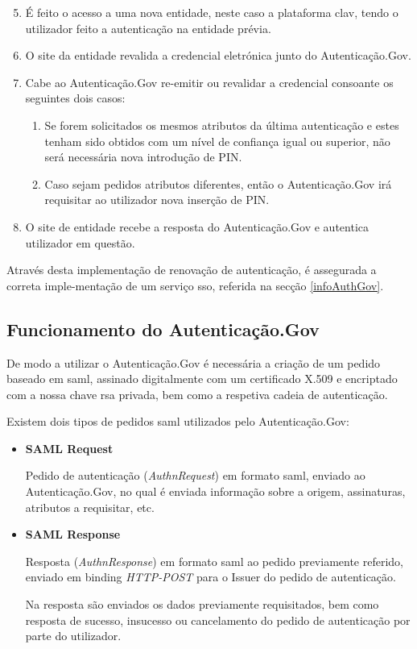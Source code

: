 \begin{enumerate}
    \setcounter{enumi}{4}
    \item É feito o acesso a uma nova entidade, neste caso a plataforma \gls{clav}, tendo o utilizador feito a autenticação na entidade prévia.
    \item O site da entidade revalida a credencial eletrónica junto do Autenticação.Gov.
    \item Cabe ao Autenticação.Gov re-emitir ou revalidar a credencial consoante os seguintes dois casos:
    \begin{enumerate}
        \item Se forem solicitados os mesmos atributos da última autenticação e estes tenham sido obtidos com um nível de confiança igual ou superior, não será necessária nova introdução de PIN.
        \item Caso sejam pedidos atributos diferentes, então o Autenticação.Gov irá requisitar ao utilizador nova inserção de PIN.
    \end{enumerate}
    \item O site de entidade recebe a resposta do Autenticação.Gov e autentica utilizador em questão.
\end{enumerate}

Através desta implementação de renovação de autenticação, é assegurada a correta imple-mentação de um serviço \gls{sso}, referida na secção \ref{infoAuthGov}.


\subsection{Funcionamento do Autenticação.Gov} \label{funcAuthGov}

De modo a utilizar o Autenticação.Gov é necessária a criação de um pedido baseado em \gls{saml}, assinado digitalmente com um certificado X.509 e encriptado com a nossa chave \gls{rsa} privada, bem como a respetiva cadeia de autenticação.

Existem dois tipos de pedidos \gls{saml} utilizados pelo Autenticação.Gov:

\begin{itemize}
    \item \textbf{SAML Request}
    
    Pedido de autenticação (\emph{AuthnRequest}) em formato \gls{saml}, enviado ao Autenticação.Gov, no qual é enviada informação sobre a origem, assinaturas, atributos a requisitar, etc.
    
    \item \textbf{SAML Response}
    
    Resposta (\emph{AuthnResponse}) em formato \gls{saml} ao pedido previamente referido, enviado em binding \emph{HTTP-POST} para o Issuer do pedido de autenticação.
    
    Na resposta são enviados os dados previamente requisitados, bem como resposta de sucesso, insucesso ou cancelamento do pedido de autenticação por parte do utilizador.
\end{itemize}

